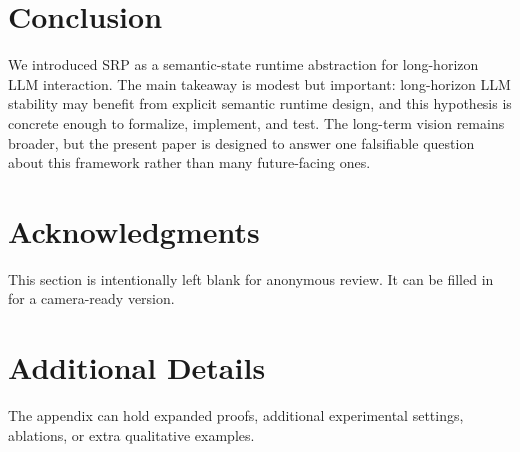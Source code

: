 \documentclass[11pt]{article}
\begin{document}
\section{Conclusion}
We introduced SRP as a semantic-state runtime abstraction for long-horizon LLM interaction. The main takeaway is modest but important: long-horizon LLM stability may benefit from explicit semantic runtime design, and this hypothesis is concrete enough to formalize, implement, and test. The long-term vision remains broader, but the present paper is designed to answer one falsifiable question about this framework rather than many future-facing ones.

\section*{Acknowledgments}
This section is intentionally left blank for anonymous review. It can be filled in for a camera-ready version.

\appendix
\section{Additional Details}
The appendix can hold expanded proofs, additional experimental settings, ablations, or extra qualitative examples.


\end{document}
